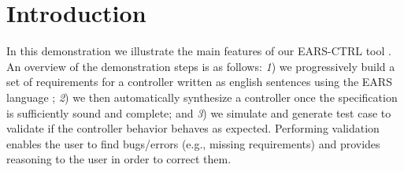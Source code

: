 \vspace{-1cm}
\section{Introduction}
\label{sec:intro}
\vspace{-.3cm}
In this demonstration we illustrate the main features of our \textsf{EARS-CTRL} tool \cite{EARSProject}.
An overview of the demonstration steps is as follows: \emph{1}) we
progressively build a set of requirements for a controller written as english
sentences using the EARS language \cite{EARS}; \emph{2}) we then automatically
synthesize a controller once the specification is sufficiently sound and
complete; and \emph{3}) we simulate and generate test case to
validate if the controller behavior behaves as expected.
Performing validation enables the user to find bugs/errors (e.g., missing
requirements) and provides reasoning to the user in order to correct
them.
